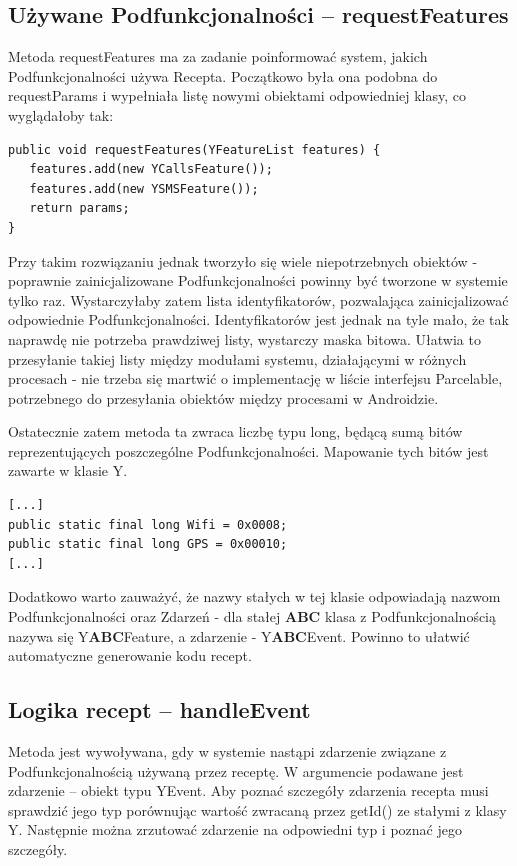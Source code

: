\documentclass[11pt,a4paper,polish,thesis]{dcsbook}
\begin{document}
\subsection{Używane Podfunkcjonalności -- requestFeatures}
Metoda requestFeatures ma za zadanie poinformować system, jakich Podfunkcjonalności używa Recepta. Początkowo była ona podobna do requestParams i wypełniała listę nowymi obiektami odpowiedniej klasy, co wyglądałoby tak:
\begin{verbatim}
public void requestFeatures(YFeatureList features) {
   features.add(new YCallsFeature());
   features.add(new YSMSFeature());
   return params;
}
\end{verbatim}
Przy takim rozwiązaniu jednak tworzyło się wiele niepotrzebnych obiektów - poprawnie zainicjalizowane Podfunkcjonalności powinny być tworzone w systemie tylko raz. Wystarczyłaby zatem lista identyfikatorów, pozwalająca zainicjalizować odpowiednie Podfunkcjonalności. Identyfikatorów jest jednak na tyle mało, że tak naprawdę nie potrzeba prawdziwej listy, wystarczy maska bitowa. Ułatwia to przesyłanie takiej listy między modułami systemu, działającymi w różnych procesach - nie trzeba się martwić o implementację w liście interfejsu Parcelable, potrzebnego do przesyłania obiektów między procesami w Androidzie.

Ostatecznie zatem metoda ta zwraca liczbę typu long, będącą sumą bitów reprezentujących poszczególne Podfunkcjonalności. Mapowanie tych bitów jest zawarte w klasie Y.
\begin{verbatim}
[...]
public static final long Wifi = 0x0008;
public static final long GPS = 0x00010;
[...]
\end{verbatim}
Dodatkowo warto zauważyć, że nazwy stałych w tej klasie odpowiadają nazwom Podfunkcjonalności oraz Zdarzeń - dla stałej {\bf ABC} klasa z Podfunkcjonalnością nazywa się Y{\bf ABC}Feature, a zdarzenie - Y{\bf ABC}Event. Powinno to ułatwić automatyczne generowanie kodu recept. 

\subsection{Logika recept -- handleEvent}
Metoda jest wywoływana, gdy w systemie nastąpi zdarzenie związane z Podfunkcjonalnością używaną przez receptę. W argumencie podawane jest zdarzenie -- obiekt typu YEvent. 
Aby poznać szczegóły zdarzenia recepta musi sprawdzić jego typ porównując wartość zwracaną przez getId() ze stałymi z klasy Y. Następnie można zrzutować zdarzenie na odpowiedni typ i poznać jego szczegóły. 
\end{document}
